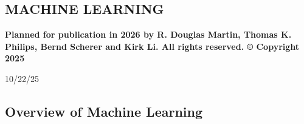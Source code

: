 \documentclass[graybox,envcountchap,sectrefs]{svmono}\usepackage[]{graphicx}\usepackage[]{xcolor}
\begin{document}
\begin{appendices}


\setcounter{chapter}{4} 

\chapter{MACHINE LEARNING\label{chap:AppendixE}}

\vspace{0.3in}

\textbf{Planned for publication in 2026 by R. Douglas Martin, Thomas
K. Philips, Bernd Scherer and Kirk Li. All rights reserved. © Copyright
2025}

\vspace{0.3in}

\begin{center}
10/22/25
\par\end{center}

\tocchpnum=30pt 
\tocsecnum=33pt 
\tocsubsecnum=40pt 
\tocsubsubsecnum=48pt 
\tocparanum=55pt 
\tocsubparanum=63pt
\calctocindent

\tableofcontents{}\newpage{}

\section{Overview of Machine Learning }


\end{appendices}
\end{document}
